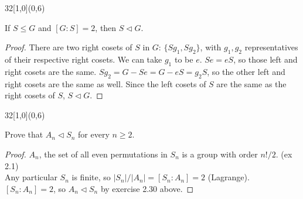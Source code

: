 \documentclass[12pt]{article}
\newcommand{\zee}{\mathbb{Z}}
\newenvironment{exercise}[2]{\begin{textblock}{32}[1,0](0,#2)\noindent#1\end{textblock}}{\vspace{1in}}
\begin{document}
%

%

\begin{exercise}{2.30}{6}
	{\noindent}If $S\le G$ and $[G:S]=2$, then $S\vartriangleleft G$.
	\bigskip

	\begin{proof}
		There are two right cosets of $S$ in $G$: $\{Sg_1, Sg_2\}$, with $g_1, g_2$ representatives of their respective right cosets.
		We can take $g_1$ to be $e$. $Se=eS$, so those left and right cosets are the same. $Sg_2=G-Se=G-eS=g_2S$, so the other left and right cosets are the same as well.
		Since the left cosets of $S$ are the same as the right cosets of $S$, $S\vartriangleleft G$.
	\end{proof}


\end{exercise}

\begin{exercise}{2.36}{6}
	{\noindent}Prove that $A_n\vartriangleleft S_n$ for every $n\ge 2$.
	\bigskip

	\begin{proof}
		$A_n$, the set of all even permutations in $S_n$ is a group with order $n!/2$. (ex 2.1)\\
		Any particular $S_n$ is finite, so $|S_n|/|A_n|=[S_n:A_n]=2$ (Lagrange).\\
		$[S_n:A_n]=2$, so $A_n\vartriangleleft S_n$ by exercise 2.30 above.
	\end{proof}
\end{exercise}
\end{document}
